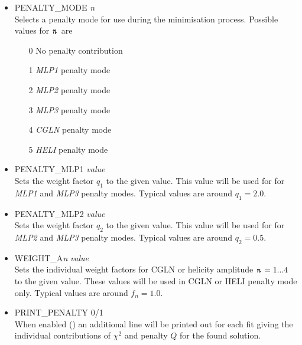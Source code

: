 \documentclass[a4paper,10pt]{article}
\def\enn{\mbox{\ttfamily\textit{n}\rmfamily}}
\def\tt{\ttfamily}
\def\rm{\rmfamily}
\begin{document}
\begin{itemize}
\item
\tt PENALTY\_MODE \textit{n}\rm\\
Selects a penalty mode for use during the minimisation process. Possible values for $\enn$ are
\vspace{-0.5em}\begin{enumerate}
\item[0\:\:] No penalty contribution
\item[1\:\:] \textit{MLP1}\hspace{0.16em} penalty mode
\item[2\:\:] \textit{MLP2}\hspace{0.16em} penalty mode
\item[3\:\:] \textit{MLP3}\hspace{0.17em} penalty mode
\item[4\:\:] \textit{CGLN} penalty mode
\item[5\:\:] \textit{HELI}\hspace{0.43em} penalty mode
\end{enumerate}

\item
\tt PENALTY\_MLP1 \textit{value}\rm\\
Sets the weight factor $q_1$ to the given value. This value will be used for for \textit{MLP1} and \textit{MLP3} penalty modes.
Typical values are around $q_1 = 2.0$.
\item
\tt PENALTY\_MLP2 \textit{value}\rm\\
Sets the weight factor $q_2$ to the given value. This value will be used for for \textit{MLP2} and \textit{MLP3} penalty modes.
Typical values are around $q_2 = 0.5$.

\item
\tt WEIGHT\_A\textit{n} \textit{value}\rm\\
Sets the individual weight factors for CGLN or helicity amplitude $\mbox{\tt\textit{n}\rm} = 1...4$ to the given value. These values will be used
in CGLN or HELI penalty mode only. Typical values are around $f_n = 1.0$.

\item
\tt PRINT\_PENALTY 0/1\rm\\
When enabled (\tt1\rm) an additional line will be printed out for each fit giving the individual contributions of $\chi^2$ and
penalty $Q$ for the found solution.

\end{itemize}
\end{document}
